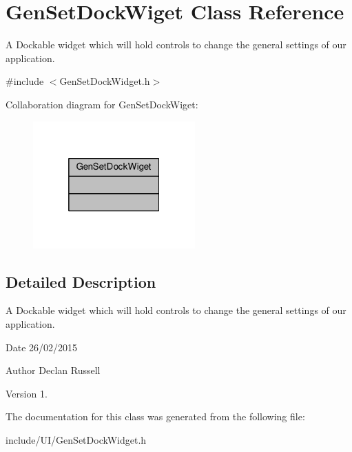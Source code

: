 \hypertarget{class_gen_set_dock_wiget}{\section{Gen\-Set\-Dock\-Wiget Class Reference}
\label{class_gen_set_dock_wiget}
}


A Dockable widget which will hold controls to change the general settings of our application.  




{\ttfamily \#include $<$Gen\-Set\-Dock\-Widget.\-h$>$}



Collaboration diagram for Gen\-Set\-Dock\-Wiget\-:
\nopagebreak
\begin{figure}[H]
\begin{center}
\leavevmode
\includegraphics[width=176pt]{class_gen_set_dock_wiget__coll__graph}
\end{center}
\end{figure}


\subsection{Detailed Description}
A Dockable widget which will hold controls to change the general settings of our application. 

\begin{DoxyDate}{Date}
26/02/2015 
\end{DoxyDate}
\begin{DoxyAuthor}{Author}
Declan Russell 
\end{DoxyAuthor}
\begin{DoxyVersion}{Version}
1. 
\end{DoxyVersion}


The documentation for this class was generated from the following file\-:\begin{DoxyCompactItemize}
\item 
include/\-U\-I/Gen\-Set\-Dock\-Widget.\-h\end{DoxyCompactItemize}
